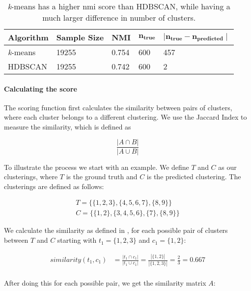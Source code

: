 \begin{table}[h]
    \centering
    \begin{tabular}{|l|l|l|l|l|}
    \hline
    \textbf{Algorithm} & \textbf{Sample Size} & \textbf{NMI}  & $\mathbf{n_{true}}$ & $\mathbf{ \mid n_{true} - n_{predicted} \mid }$ \\ \hline
    \textit{k}-means & 19255 & 0.754 & 600 & 457 \\ \hline
    HDBSCAN & 19255 & 0.742 & 600 & 2 \\ \hline
    \end{tabular}
    \caption{
        \textit{k}-means has a higher \gls{nmi} score than HDBSCAN,
        while having a much larger difference in number of clusters.
    }
    \label{tab:nmi_kmeans_example}
\end{table}

\paragraph{Calculating the score}
The scoring function first calculates the similarity between pairs of clusters,
where each cluster belongs to a different clustering.
We use the Jaccard Index to measure the similarity, which is defined as

\begin{equation}
    \label{equ:similarity}
    \frac{|A \cap B|}{|A \cup B|}
\end{equation}

To illustrate the process we start with an example.
We define $T$ and $C$ as our clusterings, where $T$ is the ground truth and $C$ is the predicted clustering.
The clusterings are defined as follows:

\begin{gather*}
    T = \{\{1,2,3\},\{4,5,6,7\},\{8,9\}\} \\
    C = \{\{1,2\},\{3,4,5,6\},\{7\},\{8,9\}\}
\end{gather*}

We calculate the similarity as defined in ,
for each possible pair of clusters between $T$ and $C$ starting with $t_1= \{1,2,3\}$ and $c_1 = \{1,2\}$:

\begin{align*}
    similarity(t_1,c_1) &=\frac{|t_1 \cap c_1|}{|t_1 \cup c_1|}
    = \frac{|\{1,2\}|}{|\{1,2,3\}|}
    = \frac{2}{3} = 0.667 \\
\end{align*}

After doing this for each possible pair, we get the similarity matrix $A$:

